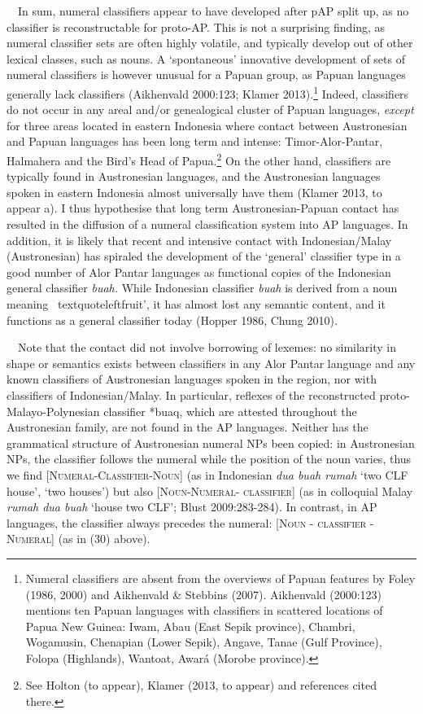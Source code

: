 \ \ In sum, numeral classifiers appear to have developed after pAP split up, as no classifier is reconstructable for proto-AP. This is not a surprising finding, as numeral classifier sets are often highly volatile, and typically develop out of other lexical classes, such as nouns. A {\textquoteleft}spontaneous{\textquoteright} innovative development of sets of numeral classifiers is however unusual for a Papuan group, as Papuan languages generally lack classifiers (Aikhenvald 2000:123; Klamer 2013).\footnote{Numeral classifiers are absent from the overviews of Papuan features by Foley (1986, 2000) and Aikhenvald \& Stebbins (2007). Aikhenvald (2000:123)  mentions ten Papuan languages with classifiers in scattered locations of Papua New Guinea: Iwam, Abau (East Sepik province), Chambri, Wogamusin, Chenapian (Lower Sepik), Angave, Tanae (Gulf Province), Folopa (Highlands), Wantoat, Awar\'a (Morobe province).} Indeed, classifiers do not occur in any areal and/or genealogical cluster of Papuan languages, \textit{
except} for three areas located in eastern Indonesia where contact between Austronesian and Papuan languages has been long term and intense: Timor-Alor-Pantar,  Halmahera and the Bird{\textquoteright}s Head of Papua.\footnote{See Holton (to appear), Klamer (2013, to appear) and references cited there.} On the other hand, classifiers are typically found in Austronesian languages, and the Austronesian languages spoken in eastern Indonesia almost universally have them (Klamer 2013, to appear a). I thus hypothesise that long term Austronesian-Papuan contact has resulted in the diffusion of a numeral classification system into AP languages. In addition, it is likely that recent and intensive contact with Indonesian/Malay (Austronesian) has spiraled the development of the {\textquoteleft}general{\textquoteright} classifier type in a good number of Alor Pantar languages as functional copies of the Indonesian general classifier \textit{buah. }While Indonesian classifier \textit{buah }is derived from a noun meaning {\
textquoteleft}fruit{\textquoteright}, it has almost lost any semantic content, and it functions as a general classifier today (Hopper 1986, Chung 2010). 

\ \ Note that the contact did not involve borrowing of lexemes: no similarity in shape or semantics exists between classifiers in any Alor Pantar language and any known classifiers of Austronesian languages spoken in the region, nor with classifiers of  Indonesian/Malay. In particular, reflexes of the reconstructed proto-Malayo-Polynesian classifier *buaq, which are attested throughout the Austronesian family, are not found in the AP languages. Neither has the grammatical structure of Austronesian numeral NPs been copied: in Austronesian NPs, the classifier follows the numeral while the position of the noun varies, thus we find [\textsc{Numeral-Classifier-Noun}] (as in Indonesian \textit{dua buah rumah }{\textquoteleft}two CLF house{\textquoteright}, {\textquoteleft}two houses{\textquoteright}) but also \textsc{[Noun-Numeral- classifier]} (as in colloquial Malay \textit{rumah dua buah} {\textquoteleft}house two CLF{\textquoteright}; Blust 2009:283-284). In contrast, in AP languages, the classifier always 
precedes the numeral: \textsc{[Noun - classifier - Numeral] (}as in (30) above).

